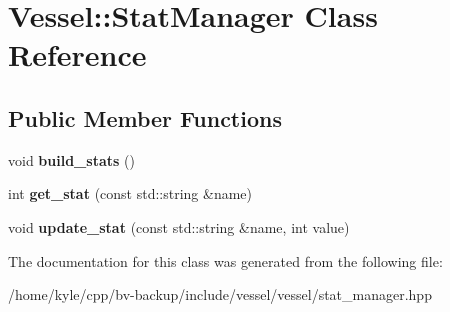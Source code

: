 \hypertarget{class_vessel_1_1_stat_manager}{}\section{Vessel\+:\+:Stat\+Manager Class Reference}
\label{class_vessel_1_1_stat_manager}
\subsection*{Public Member Functions}
\begin{DoxyCompactItemize}
\item 
\mbox{\label{class_vessel_1_1_stat_manager_a262852c31380b031464e78f7b3f5d6b3}} 
void {\bfseries build\+\_\+stats} ()
\item 
\mbox{\label{class_vessel_1_1_stat_manager_abc19fb509e44ee43998cfc44820595ce}} 
int {\bfseries get\+\_\+stat} (const std\+::string \&name)
\item 
\mbox{\label{class_vessel_1_1_stat_manager_a9ba260d63f5323fda8a6bdc2ae2c2644}} 
void {\bfseries update\+\_\+stat} (const std\+::string \&name, int value)
\end{DoxyCompactItemize}


The documentation for this class was generated from the following file\+:\begin{DoxyCompactItemize}
\item 
/home/kyle/cpp/bv-\/backup/include/vessel/vessel/stat\+\_\+manager.\+hpp\end{DoxyCompactItemize}
